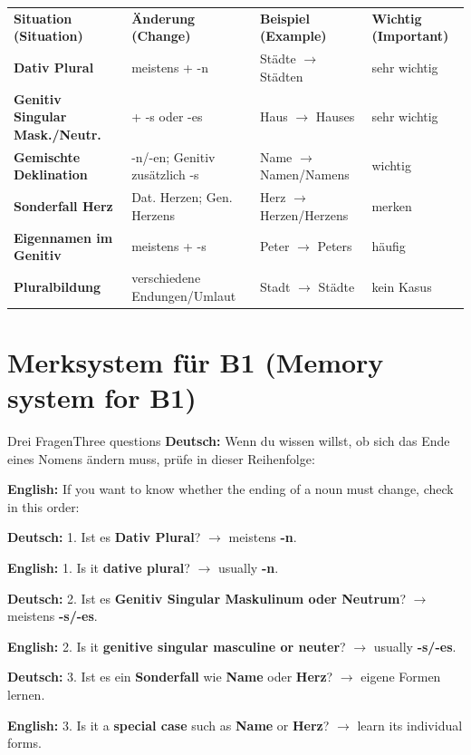 \documentclass[a4paper,11pt]{article}
\newcommand{\GermanText}[1]{\textbf{Deutsch: }#1\par}
\newcommand{\EnglishText}[1]{{\small\color{SoftGray}\textbf{English: }#1\par}}
\begin{document}
\begin{longtable}{>{\bfseries}p{3.3cm}|p{4.0cm}|p{4.0cm}|p{3.0cm}}
\rowcolor{HeaderBlueDark}
\color{white}\textbf{Situation (Situation)} &
\color{white}\textbf{Änderung (Change)} &
\color{white}\textbf{Beispiel (Example)} &
\color{white}\textbf{Wichtig (Important)} \\
Dativ Plural & meistens + -n & Städte $\rightarrow$ Städten & sehr wichtig \\
Genitiv Singular Mask./Neutr. & + -s oder -es & Haus $\rightarrow$ Hauses & sehr wichtig \\
Gemischte Deklination & -n/-en; Genitiv zusätzlich -s & Name $\rightarrow$ Namen/Namens & wichtig \\
Sonderfall Herz & Dat. Herzen; Gen. Herzens & Herz $\rightarrow$ Herzen/Herzens & merken \\
Eigennamen im Genitiv & meistens + -s & Peter $\rightarrow$ Peters & häufig \\
Pluralbildung & verschiedene Endungen/Umlaut & Stadt $\rightarrow$ Städte & kein Kasus \\
\end{longtable}


\section{Merksystem für B1 \textnormal{(Memory system for B1)}}

\begin{grammarentry}{Drei Fragen}{Three questions}
\GermanText{Wenn du wissen willst, ob sich das Ende eines Nomens ändern muss, prüfe in dieser Reihenfolge:}
\EnglishText{If you want to know whether the ending of a noun must change, check in this order:}

\GermanText{1. Ist es \textbf{Dativ Plural}? $\rightarrow$ meistens \textbf{-n}.}
\EnglishText{1. Is it \textbf{dative plural}? $\rightarrow$ usually \textbf{-n}.}

\GermanText{2. Ist es \textbf{Genitiv Singular Maskulinum oder Neutrum}? $\rightarrow$ meistens \textbf{-s/-es}.}
\EnglishText{2. Is it \textbf{genitive singular masculine or neuter}? $\rightarrow$ usually \textbf{-s/-es}.}

\GermanText{3. Ist es ein \textbf{Sonderfall} wie \textbf{Name} oder \textbf{Herz}? $\rightarrow$ eigene Formen lernen.}
\EnglishText{3. Is it a \textbf{special case} such as \textbf{Name} or \textbf{Herz}? $\rightarrow$ learn its individual forms.}
\end{grammarentry}
\end{document}
